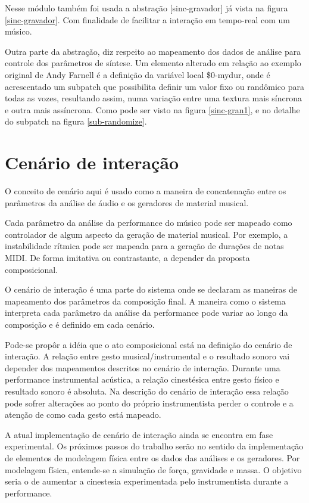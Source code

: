 \documentclass{ppgmus}
\begin{document}
Nesse módulo também foi usada a abstração [sinc-gravador] já vista na figura \ref{sinc-gravador}.
Com finalidade de facilitar a interação em tempo-real com um músico.

Outra parte da abstração, diz respeito ao mapeamento dos dados de análise para controle
dos parâmetros de síntese. Um elemento alterado em relação ao exemplo original de Andy
Farnell é a definição da variável local \$0-mydur, onde é acrescentado um subpatch que 
possibilita definir um valor fixo ou randômico para todas as vozes, resultando assim, numa variação entre
uma textura mais síncrona e outra mais assíncrona. Como pode ser visto na figura \ref{sinc-gran1},
e no detalhe do subpatch na figura \ref{sub-randomize}.


\pagebreak

\section{Cenário de interação}


O conceito de cenário aqui é usado como a maneira de concatenação
entre os parâmetros da análise de áudio e os geradores de material
musical.


Cada parâmetro da análise da performance do músico pode ser mapeado como controlador
de algum aspecto da geração de material musical. Por exemplo,
a instabilidade rítmica pode ser mapeada para a geração de durações
de notas MIDI. De forma imitativa ou contrastante, a depender da
proposta composicional.

O cenário de interação é uma parte do sistema onde se declaram
as maneiras de mapeamento dos parâmetros da composição final. A maneira
como o sistema interpreta cada parâmetro da análise da performance pode
variar ao longo da composição e é definido em cada cenário.

Pode-se propôr a idéia que o ato composicional está na definição
do cenário de interação. A relação entre gesto musical/instrumental e 
o resultado sonoro vai depender dos mapeamentos descritos no cenário
de interação. Durante uma performance instrumental acústica, a relação
cinestésica entre gesto físico e resultado sonoro é absoluta. Na descrição
do cenário de interação essa relação pode sofrer alterações ao ponto
do próprio instrumentista perder o controle e a atenção de como cada
gesto está mapeado.

A atual implementação de cenário de interação ainda se encontra em fase 
experimental. Os próximos passos do trabalho serão no sentido da implementação
de elementos de modelagem física entre os dados das análises e os geradores.
Por modelagem física, entende-se a simulação de força, gravidade e massa. O 
objetivo seria o de aumentar a cinestesia experimentada pelo instrumentista 
durante a performance.
\end{document}
